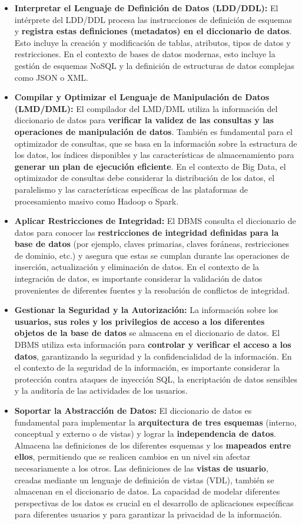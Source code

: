 \begin{itemize}
    \item \textbf{Interpretar el Lenguaje de Definición de Datos (LDD/DDL):} El intérprete del LDD/DDL procesa las instrucciones de definición de esquemas y \textbf{registra estas definiciones (metadatos) en el diccionario de datos}.  Esto incluye la creación y modificación de tablas, atributos, tipos de datos y restricciones. En el contexto de bases de datos modernas, esto incluye la gestión de esquemas NoSQL y la definición de estructuras de datos complejas como JSON o XML.
    \item \textbf{Compilar y Optimizar el Lenguaje de Manipulación de Datos (LMD/DML):} El compilador del LMD/DML utiliza la información del diccionario de datos para \textbf{verificar la validez de las consultas y las operaciones de manipulación de datos}.  También es fundamental para el optimizador de consultas, que se basa en la información sobre la estructura de los datos, los índices disponibles y las características de almacenamiento para \textbf{generar un plan de ejecución eficiente}.  En el contexto de Big Data, el optimizador de consultas debe considerar la distribución de los datos, el paralelismo y las características específicas de las plataformas de procesamiento masivo como Hadoop o Spark.
    \item \textbf{Aplicar Restricciones de Integridad:} El DBMS consulta el diccionario de datos para conocer las \textbf{restricciones de integridad definidas para la base de datos} (por ejemplo, claves primarias, claves foráneas, restricciones de dominio, etc.) y asegura que estas se cumplan durante las operaciones de inserción, actualización y eliminación de datos.  En el contexto de la integración de datos, es importante considerar la validación de datos provenientes de diferentes fuentes y la resolución de conflictos de integridad.
    \item \textbf{Gestionar la Seguridad y la Autorización:} La información sobre los \textbf{usuarios, sus roles y los privilegios de acceso a los diferentes objetos de la base de datos} se almacena en el diccionario de datos.  El DBMS utiliza esta información para \textbf{controlar y verificar el acceso a los datos}, garantizando la seguridad y la confidencialidad de la información.  En el contexto de la seguridad de la información, es importante considerar la protección contra ataques de inyección SQL, la encriptación de datos sensibles y la auditoría de las actividades de los usuarios.
    \item \textbf{Soportar la Abstracción de Datos:} El diccionario de datos es fundamental para implementar la \textbf{arquitectura de tres esquemas} (interno, conceptual y externo o de vistas) y lograr la \textbf{independencia de datos}.  Almacena las definiciones de los diferentes esquemas y los \textbf{mapeados entre ellos}, permitiendo que se realicen cambios en un nivel sin afectar necesariamente a los otros. Las definiciones de las \textbf{vistas de usuario}, creadas mediante un lenguaje de definición de vistas (VDL), también se almacenan en el diccionario de datos. La capacidad de modelar diferentes perspectivas de los datos es crucial en el desarrollo de aplicaciones específicas para diferentes usuarios y para garantizar la privacidad de la información.

\end{itemize}
